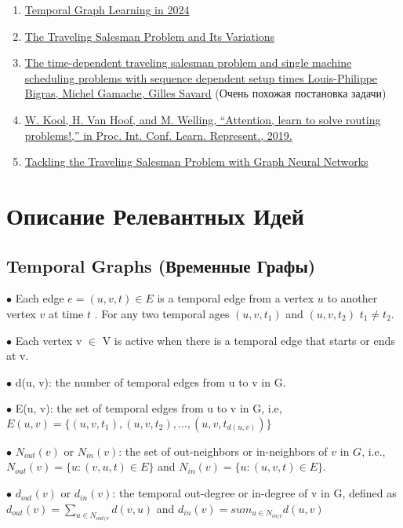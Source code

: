 \begin{enumerate}
    \item \href{https://towardsdatascience.com/temporal-graph-learning-in-2024-feaa9371b8e2}{Temporal Graph Learning in 2024}
    \item \href{https://link.springer.com/book/10.1007/b101971}{The Traveling Salesman Problem and Its Variations}
    \item \href{https://www.sciencedirect.com/science/article/pii/S1572528608000339}{The time-dependent traveling salesman problem and single machine
scheduling problems with sequence dependent setup times
Louis-Philippe Bigras, Michel Gamache, Gilles Savard} (Очень похожая постановка задачи)
    \item \href{https://arxiv.org/abs/1803.08475}{W. Kool, H. Van Hoof, and M. Welling, “Attention, learn to solve routing
problems!,” in Proc. Int. Conf. Learn. Represent., 2019.}
    \item \href{https://medium.com/stanford-cs224w/tackling-the-traveling-salesman-problem-with-graph-neural-networks-b86ef4300c6e}{Tackling the Traveling Salesman Problem with Graph Neural Networks}
\end{enumerate}

\section{Описание Релевантных Идей}

\subsection{Temporal Graphs (Временные Графы)}

$\bullet$ Each edge $e = (u, v, t) \in E$ is a temporal edge from a vertex $u$ to another vertex $v$ at time $t$ . For any two temporal ages $(u,v,t_1)$ and $(u,v,t_2)$ $t_1 \neq t_2$.

$\bullet$ Each vertex v $\in$ V is active when there is a temporal edge that starts or ends at v.

$\bullet$ d(u, v): the number of temporal edges from u to v in G.

$ \bullet $ E(u, v): the set of temporal edges from u to v in G,  i.e, $E(u,v)=\{(u,v,t_1),(u,v,t_2), ..., (u,v,t_{d(u,v)} )\}$

$\bullet$ $N_{out}(v)$ or $N_{in} (v)$: the set of out-neighbors or in-neighbors
of $v$ in $G$, i.e., $N_{out}(v) = \{u : (v, u, t) ∈ E\}$ and $N_{in}(v) =
\{u : (u, v, t) ∈ E\}$.

$\bullet$ $d_{out}(v)$ or $d_{in} (v)$: the temporal out-degree or in-degree of v
in G, defined as $d_{out}(v) = \sum_{u \in N_{out(v}} d(v,u)$ and $d_{in} (v) = sum_{u \in N_{in(v}}d(u,v)$

